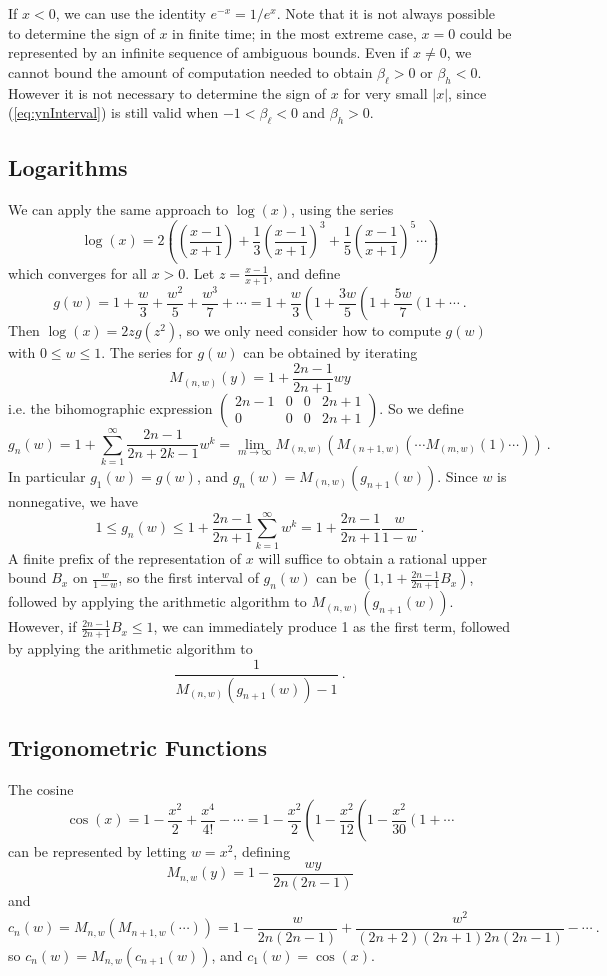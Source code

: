 \documentclass[11pt, oneside]{amsart}   	%
\newcommand{\bihomographic}[8]{\left(\begin{smallmatrix}#1&#2&#3&#4\\#5&#6&#7&#8\end{smallmatrix}\right)}
\renewcommand{\:}{\negthickspace:\negthickspace}
\begin{document}
If $x < 0$, we can use the identity $e^{-x} = 1/e^x$. Note that it is not always possible to determine the sign of $x$ in finite time; in the most extreme case, $x=0$ could be represented by an infinite sequence of ambiguous bounds. Even if $x \neq 0$, we cannot bound the amount of computation needed to obtain $\beta_{\ell} > 0$ or $\beta_h < 0$. However it is not necessary to determine the sign of $x$ for very small $|x|$, since (\ref{eq:ynInterval}) is still valid when $-1 < \beta_{\ell} < 0$ and $\beta_h > 0$.


\subsection{Logarithms} We can apply the same approach to $\log(x)$, using the series
\[
\log (x) =  2 \left( \left(\frac{x-1}{x+1}\right) + \frac{1}{3}\left(\frac{x-1}{x+1}\right)^3 + \frac{1}{5}\left(\frac{x-1}{x+1}\right)^5 \cdots \right)
\]
which converges for all $x > 0$. Let $z=\frac{x-1}{x+1}$, and define
\[
g(w) = 1 + \frac{w}{3} + \frac{w^2}{5} + \frac{w^3}{7} + \cdots = 1 + \frac{w}{3}\left(1 + \frac{3w}{5}\left(1 + \frac{5w}{7}\left(1 +\cdots \right. \right. \right.\ .
\]
Then $\log(x) = 2zg(z^2)$, so we only need consider how to compute $g(w)$ with $0 \leq w \leq 1$.
The series for $g(w)$ can be obtained by iterating
\[
M_{(n,w)}(y) = 1 + \frac{2n-1}{2n+1}wy 
\]
i.e. the bihomographic expression $\bihomographic{2n-1}{0}{0}{2n+1}{0}{0}{0}{2n+1}$.
So we define
\[
g_n(w) = 1  + \sum_{k=1}^{\infty}\frac{2n-1}{2n+2k-1}w^k= \lim_{m\to\infty} M_{(n,w)}( M_{(n+1,w)}( \cdots M_{(m,w)}(1) \cdots ) ) \ .
\]
In particular $g_1(w) = g(w)$, and $g_n(w) = M_{(n,w)}(g_{n+1}(w))$. Since $w$ is nonnegative, we have
\begin{equation}\label{eq:logbound}
1 \leq g_n(w) \leq 1 + \frac{2n-1}{2n+1}\sum_{k=1}^{\infty} w^k = 1+\frac{2n-1}{2n+1}\frac{w}{1-w}\ .
\end{equation}
A finite prefix of the representation of $x$ will suffice to obtain a rational upper bound $B_x$ on $\frac{w}{1-w}$, so the first interval of $g_n(w)$ can be $(1, 1+\frac{2n-1}{2n+1}B_x)$, followed by applying the arithmetic algorithm to $M_{(n,w)}(g_{n+1}(w))$. However, if $\frac{2n-1}{2n+1}B_x \leq 1$, we can immediately produce 1 as the first term, followed by applying the
arithmetic algorithm to
\[
\frac{1}{M_{(n,w)}(g_{n+1}(w)) - 1}\ .
\]


\subsection{Trigonometric Functions}
The cosine
\[
\cos(x) = 1 - \frac{x^2}{2} + \frac{x^4}{4!} - \cdots = 1 - \frac{x^2}{2} \left(1 - \frac{x^2}{12}\left( 1 - \frac{x^2}{30}\left(1 + \cdots \right. \right.  \right.  
\]
can be represented by letting $w=x^2$, defining
\[
M_{n,w}(y) = 1 - \frac{wy}{2n(2n-1)}
\]
and
\begin{equation}\label{eq:cosIter}
c_n(w) = M_{n,w}(M_{n+1,w}(\cdots)) = 1 - \frac{w}{2n(2n-1)} + \frac{w^2}{(2n+2)(2n+1)2n(2n-1)} - \cdots \ .
\end{equation}
so $c_n(w) = M_{n,w}(c_{n+1}(w))$, and $c_1(w) = \cos(x)$.
\end{document}
